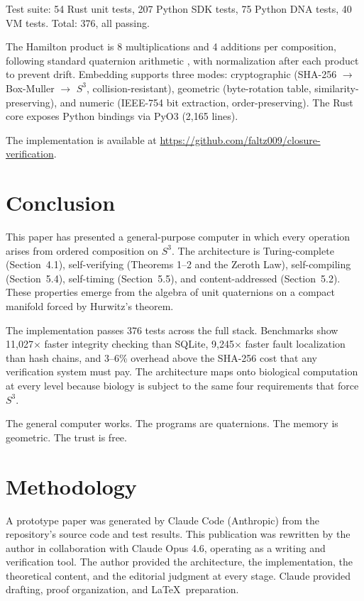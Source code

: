 \documentclass[12pt,a4paper]{article}
\begin{document}
Test suite: 54 Rust unit tests, 207 Python SDK tests, 75 Python DNA tests, 40 VM tests. Total: 376, all passing.

The Hamilton product is 8 multiplications and 4 additions per composition, following standard quaternion arithmetic \cite{hamilton1843, shoemake1985}, with normalization after each product to prevent drift. Embedding supports three modes: cryptographic (SHA-256 $\to$ Box-Muller $\to$ $S^3$, collision-resistant), geometric (byte-rotation table, similarity-preserving), and numeric (IEEE-754 bit extraction, order-preserving). The Rust core exposes Python bindings via PyO3 (2,165 lines).

The implementation is available at \url{https://github.com/faltz009/closure-verification}.


\section{Conclusion}

This paper has presented a general-purpose computer in which every operation arises from ordered composition on $S^3$. The architecture is Turing-complete (Section~4.1), self-verifying (Theorems 1--2 and the Zeroth Law), self-compiling (Section~5.4), self-timing (Section~5.5), and content-addressed (Section~5.2). These properties emerge from the algebra of unit quaternions on a compact manifold forced by Hurwitz's theorem.

The implementation passes 376 tests across the full stack. Benchmarks show 11,027$\times$ faster integrity checking than SQLite, 9,245$\times$ faster fault localization than hash chains, and 3--6\% overhead above the SHA-256 cost that any verification system must pay. The architecture maps onto biological computation at every level because biology is subject to the same four requirements that force $S^3$.

The general computer works. The programs are quaternions. The memory is geometric. The trust is free.


\section*{Methodology}

A prototype paper was generated by Claude Code (Anthropic) from the repository's source code and test results. This publication was rewritten by the author in collaboration with Claude Opus 4.6, operating as a writing and verification tool. The author provided the architecture, the implementation, the theoretical content, and the editorial judgment at every stage. Claude provided drafting, proof organization, and \LaTeX\ preparation.
\end{document}
